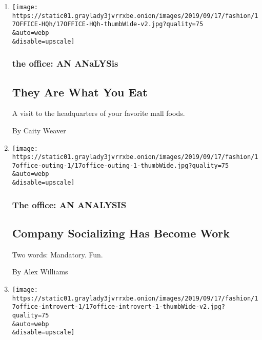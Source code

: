 \begin{enumerate}
\def\labelenumi{\arabic{enumi}.}
\item
  \href{/2019/09/17/style/moes-cinnabon-focus-brands.html}{}

  \texttt{[image: https://static01.graylady3jvrrxbe.onion/images/2019/09/17/fashion/17OFFICE-HQh/17OFFICE-HQh-thumbWide-v2.jpg?quality=75\\\&auto=webp\\\&disable=upscale]}

  \hypertarget{the-office-an-analysis-4}{%
  \subsubsection{the office: AN
  ANaLYSis}\label{the-office-an-analysis-4}}

  \hypertarget{they-are-what-you-eat}{%
  \subsection{They Are What You Eat}\label{they-are-what-you-eat}}

  A visit to the headquarters of your favorite mall foods.

  By Caity Weaver
\item
  \href{/2019/09/17/style/company-socializing-is-work.html}{}

  \texttt{[image: https://static01.graylady3jvrrxbe.onion/images/2019/09/17/fashion/17office-outing-1/17office-outing-1-thumbWide.jpg?quality=75\\\&auto=webp\\\&disable=upscale]}

  \hypertarget{the-office-an-analysis-5}{%
  \subsubsection{The office: AN
  ANALYSIS}\label{the-office-an-analysis-5}}

  \hypertarget{company-socializing-has-become-work}{%
  \subsection{Company Socializing Has Become
  Work}\label{company-socializing-has-become-work}}

  Two words: Mandatory. Fun.

  By Alex Williams
\item
  \href{/2019/09/17/style/the-plight-of-the-office-introvert.html}{}

  \texttt{[image: https://static01.graylady3jvrrxbe.onion/images/2019/09/17/fashion/17office-introvert-1/17office-introvert-1-thumbWide-v2.jpg?quality=75\\\&auto=webp\\\&disable=upscale]}


\end{enumerate}
